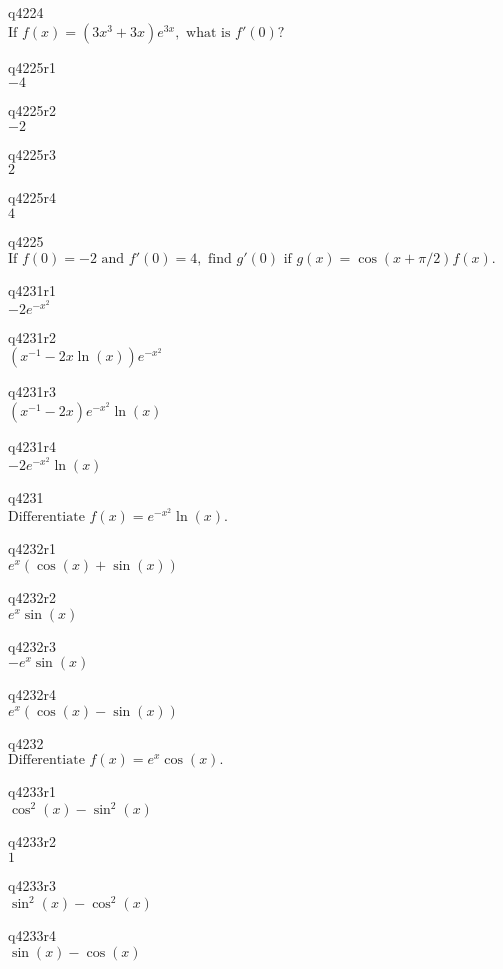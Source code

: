 q4224\\
\(\displaystyle \text{If } f(x) = (3x^3 + 3x) e^{3x}, \text{ what is } f'(0)? \)

q4225r1\\
\(\displaystyle -4 \)

q4225r2\\
\(\displaystyle -2 \)

q4225r3\\
\(\displaystyle 2 \)

q4225r4\\
\(\displaystyle 4 \)

q4225\\
\(\displaystyle \text{If } f(0) = -2 \text{ and } f'(0) = 4, \text{ find } g'(0) \text { if } g(x) = \cos(x + \pi/2) f(x). \)

q4231r1\\
\(\displaystyle -2e^{-x^2} \)

q4231r2\\
\(\displaystyle (x^{-1} - 2x\ln(x)) e^{-x^2} \)

q4231r3\\
\(\displaystyle (x^{-1} - 2x) e^{-x^2} \ln(x) \)

q4231r4\\
\(\displaystyle -2e^{-x^2} \ln(x) \)

q4231\\
\(\displaystyle \text{Differentiate } f(x) = e^{-x^2} \ln(x). \)

q4232r1\\
\(\displaystyle e^x (\cos(x) + \sin(x)) \)

q4232r2\\
\(\displaystyle e^x \sin(x) \)

q4232r3\\
\(\displaystyle -e^x \sin(x) \)

q4232r4\\
\(\displaystyle e^x (\cos(x) - \sin(x)) \)

q4232\\
\(\displaystyle \text{Differentiate } f(x) = e^x \cos(x). \)

q4233r1\\
\(\displaystyle \cos^2(x) - \sin^2(x) \)

q4233r2\\
\(\displaystyle 1 \)

q4233r3\\
\(\displaystyle \sin^2(x) - \cos^2(x) \)

q4233r4\\
\(\displaystyle \sin(x) - \cos(x) \)

